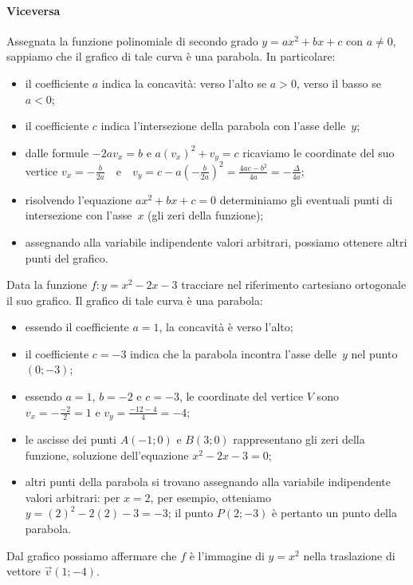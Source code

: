 \paragraph{Viceversa}
Assegnata la funzione polinomiale di secondo grado $y={ax}^2+{bx}+c$ con $a\neq 0$, sappiamo che il grafico di tale curva è una parabola. In particolare:
\begin{itemize}
\item il coefficiente $a$ indica la concavità: verso l'alto se $a>0$, verso il basso se $a<0$;
\item il coefficiente $c$ indica l'intersezione della parabola con l'asse delle~$y$;
\item dalle formule $-2av_x=b$ e $a(v_x)^2+v_y=c$ ricaviamo le coordinate del suo vertice $v_x=-\frac b{2a}$~~e~~$v_y=c-a\left(-\frac b{2a}\right)^2=\frac{4ac-b^2}{4a}=-\frac{\Delta }{4a}$;
\item risolvendo l'equazione ${ax}^2+{bx}+c=0$ determiniamo gli eventuali punti di intersezione con l'asse~$x$ (gli zeri della funzione);
\item assegnando alla variabile indipendente valori arbitrari, possiamo ottenere altri punti del grafico.
\end{itemize}

\begin{exrig}
\begin{esempio}
Data la funzione $f: y=x^2-2x-3$ tracciare nel riferimento cartesiano ortogonale il suo grafico.
Il grafico di tale curva è una parabola:
\begin{itemize}
\item essendo il coefficiente $a=1$, la concavità è verso l'alto;
\item il coefficiente $c=-3$ indica che la parabola incontra l'asse delle~$y$ nel punto $(0;-3)$;
\item essendo $a=1$, $b=-2$ e $c=-3$, le coordinate del vertice $V$ sono $v_x=-\frac{-2} 2=1$ e $v_y=\frac{-12-4} 4=-4$;
\item le ascisse dei punti $A(-1;0)$ e $B(3;0)$ rappresentano gli zeri della funzione, soluzione dell'equazione $x^2-2x-3=0$;
\item altri punti della parabola si trovano assegnando alla variabile indipendente valori arbitrari: per $x=2$, per esempio, otteniamo $y=(2)^2-2(2)-3=-3$; il punto $P(2;-3)$ è pertanto un punto della parabola.
\end{itemize}
Dal grafico possiamo affermare che $f$ è l'immagine di $y=x^2$ nella traslazione di vettore $\vec v(1;-4)$.
\begin{center}
 
\end{center}
\end{esempio}
\end{exrig}
\vspazio\ovalbox{\risolvii \ref{ese:4.7}, \ref{ese:4.8}}

